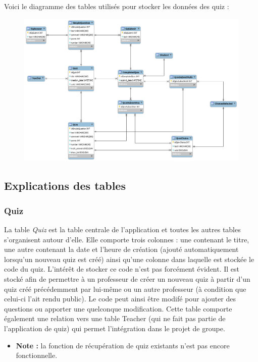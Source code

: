 \documentclass[letterpaper,10pt,french]{sphinxmanual}
\begin{document}
Voici le diagramme des tables utilisés pour stocker les données des quiz :
\begin{figure}[htbp]
\centering

\includegraphics{quiz-models.png}
\end{figure}


\subsection{Explications des tables}
\label{database:explications-des-tables}

\subsubsection{Quiz}
\label{database:quiz}
La table \emph{Quiz} est la table centrale de l'application et toutes les autres tables s'organisent autour d'elle. Elle comporte trois colonnes : une contenant le titre, une autre contenant la date et l'heure de création (ajouté automatiquement lorsqu'un nouveau quiz est créé) ainsi qu'une colonne dans laquelle est stockée le code du quiz. L'intérêt de stocker ce code n'est pas forcément évident. Il est stocké afin de permettre à un professeur de créer un nouveau quiz à partir d'un quiz créé précédemment par lui-même ou un autre professeur (à condition que celui-ci l'ait rendu public). Le code peut ainsi être modifé pour ajouter des questions ou apporter une quelconque modification. Cette table comporte également une relation vers une table Teacher (qui ne fait pas partie de l'application de quiz) qui permet l'intégration dans le projet de groupe.
\begin{itemize}
\item {} 
\textbf{Note :} la fonction de récupération de quiz existants n'est pas encore fonctionnelle.

\end{itemize}
\end{document}
